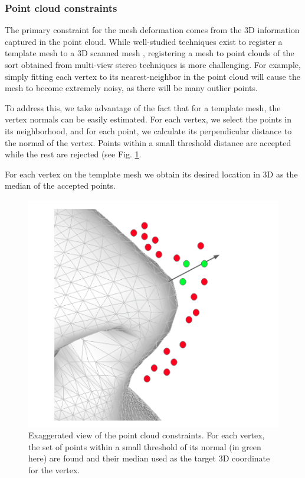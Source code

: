 \documentclass[10pt,twocolumn,letterpaper]{article}
\begin{document}
 
 \subsubsection{Point cloud constraints}
 The primary constraint for the mesh deformation comes from the 3D information captured in the point cloud.
 While well-studied techniques exist to register a template mesh to a 3D scanned mesh \cite{amberg2007optimal}, registering a mesh to point clouds of the sort obtained from multi-view stereo techniques is more challenging. For example, simply fitting each vertex to its nearest-neighbor in the point cloud will cause the mesh to become extremely noisy, as there will be many outlier points.
 
To address this, we take advantage of the fact that for a template mesh, the vertex normals can be easily estimated. For each vertex, we select the points in its neighborhood, and for each point, we calculate its perpendicular distance to the normal of the vertex. Points within a small threshold distance are accepted while the rest are rejected (see Fig. \ref{fig:mesh_fit_pcl}. 
 
 For each vertex on the template mesh we obtain its desired location in 3D as the median of the accepted points. \\
 
\begin{figure}[t]
\begin{center}
   \includegraphics[width=0.6\linewidth]{images/mesh_fit_pcl.png}
\end{center}
   \caption{Exaggerated view of the point cloud constraints. For each vertex, the set of points within a small threshold of its normal (in green here) are found and their median used as the target 3D coordinate for the vertex. }
\label{fig:mesh_fit_pcl}
\end{figure}
\end{document}
